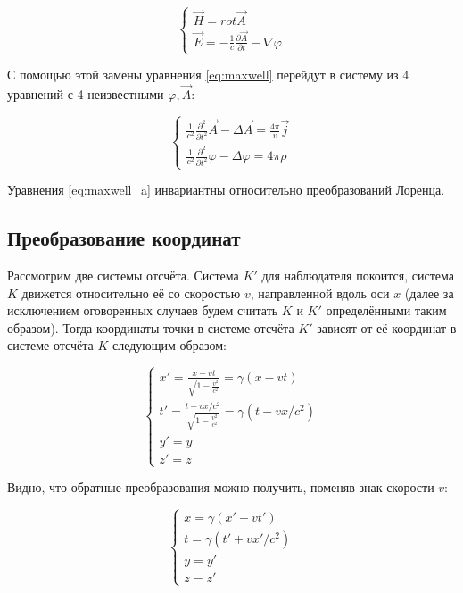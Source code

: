 \documentclass{article}
\begin{document}
\begin{equation}
    \begin{cases}
    \vec{H}=rot\vec{A}\\
    \vec{E}=-\frac{1}{c}\frac{\partial\vec{A}}{\partial t}-\nabla\varphi
    \end{cases}
\end{equation}

С помощью этой замены уравнения \eqref{eq:maxwell} перейдут в систему из 4 уравнений с 4 неизвестными $\varphi,\vec{A}$:

\begin{equation}\label{eq:maxwell_a}
    \begin{cases}
    \frac{1}{c^2}\frac{\partial^2}{\partial t^2}\vec{A}-\Delta\vec{A}=\frac{4\pi}{v}\vec{j}\\
    \frac{1}{c^2}\frac{\partial^2}{\partial t^2}\varphi-\Delta\varphi=4\pi\rho
    \end{cases}
\end{equation}

Уравнения \eqref{eq:maxwell_a} инвариантны относительно преобразований Лоренца.

\subsection{Преобразование координат}

Рассмотрим две системы отсчёта. Система $K'$ для наблюдателя покоится, система $K$ движется относительно её со скоростью $v$, направленной вдоль оси $x$ (далее за исключением оговоренных случаев будем считать $K$ и $K'$ определёнными таким образом). Тогда координаты точки в системе отсчёта $K'$ зависят от её координат в системе отсчёта $K$ следующим образом:

\begin{equation}\label{eq:lorentz_coord}
    \begin{cases}
    x'=\frac{x-vt}{\sqrt{1-\frac{v^2}{c^2}}}=\gamma\left(x-vt\right)\\
    t'=\frac{t-vx/c^2}{\sqrt{1-\frac{v^2}{c^2}}}=\gamma\left(t-vx/c^2\right)\\
    y'=y\\
    z'=z
    \end{cases}
\end{equation}

Видно, что обратные преобразования можно получить, поменяв знак скорости $v$:

\begin{equation}
    \begin{cases}
    x=\gamma\left(x'+vt'\right)\\
    t=\gamma\left(t'+vx'/c^2\right)\\
    y=y'\\
    z=z'
    \end{cases}
\end{equation}
\end{document}
